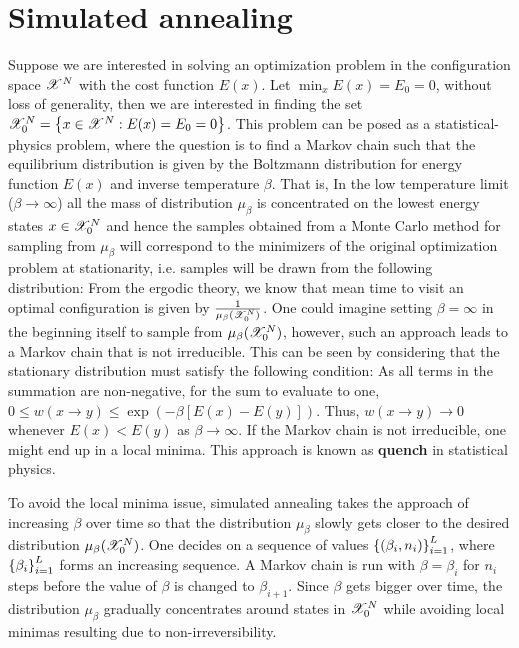 \documentclass[letterpaper,english,10pt]{article}
\begin{document}
\section{Simulated annealing}
Suppose we are interested in solving an optimization problem in the configuration space $\mathscr{X}^N$ with the cost function $E(x)$. 
Let $\min_xE(x) = E_0 = 0$, without loss of generality, 
then we are interested in finding the set $\mathscr{X}^N_0 = \left\{x \in \mathscr{X}^N: E(x) = E_0 = 0\right\}$. 
This problem can be posed as a statistical-physics problem, where the question is to find a Markov chain such that the equilibrium distribution is given by the Boltzmann distribution for energy function $E(x)$ and inverse temperature $\beta$. 
That is, 
In the low temperature limit ($\beta \to \infty$) all the mass of distribution $\mu_\beta$ is concentrated on the lowest energy states $x \in \mathscr{X}_0^N$ and hence the samples obtained from a Monte Carlo method for sampling from $\mu_\beta$ will correspond to the minimizers of the original optimization problem at stationarity, i.e. samples will be drawn from the following distribution:
From the ergodic theory, we know that mean time to visit an optimal configuration is given by $\frac{1}{\mu_\beta(\mathscr{X}_0^N)}$. One could imagine setting $\beta = \infty$ in the beginning itself to sample from $\mu_\beta(\mathscr{X}_0^N)$, however, such an approach leads to a Markov chain that is not irreducible. This can be seen by considering that the stationary distribution must satisfy the following condition:
As all terms in the summation are non-negative, for the sum to evaluate to one, $0 \le w(x \to y) \le \exp(-\beta[E(x) - E(y)])$. Thus, $w(x \to y) \to 0$ whenever $E(x) < E(y)$ as $\beta \to \infty$. If the Markov chain is not irreducible, one might end up in a local minima. This approach is known as \textbf{quench} in statistical physics.

To avoid the local minima issue, simulated annealing takes the approach of increasing $\beta$ over time so that the distribution $\mu_\beta$ slowly gets closer to the desired distribution $\mu_\beta(\mathscr{X}_0^N)$. One decides on a sequence of values $\left\{(\beta_i, n_i)\right\}_{i=1}^L$, where $\left\{\beta_i\right\}_{i=1}^L$ forms an increasing sequence. A Markov chain is run with $\beta = \beta_i$ for $n_i$ steps before the value of $\beta$ is changed to $\beta_{i+1}$. Since $\beta$ gets bigger over time, the distribution $\mu_\beta$ gradually concentrates around states in $\mathscr{X}_0^N$ while avoiding local minimas resulting due to non-irreversibility.
\end{document}
